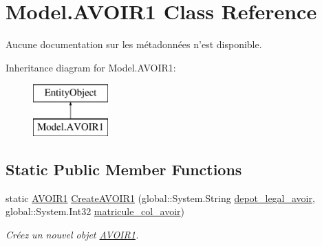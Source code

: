 \hypertarget{class_model_1_1_a_v_o_i_r1}{\section{Model.\-A\-V\-O\-I\-R1 Class Reference}
\label{class_model_1_1_a_v_o_i_r1}
}


Aucune documentation sur les métadonnées n'est disponible.  


Inheritance diagram for Model.\-A\-V\-O\-I\-R1\-:\begin{figure}[H]
\begin{center}
\leavevmode
\includegraphics[height=2.000000cm]{class_model_1_1_a_v_o_i_r1}
\end{center}
\end{figure}
\subsection*{Static Public Member Functions}
\begin{DoxyCompactItemize}
\item 
static \hyperlink{class_model_1_1_a_v_o_i_r1}{A\-V\-O\-I\-R1} \hyperlink{class_model_1_1_a_v_o_i_r1_a64ce6c9838eeeeadfb9829843eb2d72f}{Create\-A\-V\-O\-I\-R1} (global\-::\-System.\-String \hyperlink{class_model_1_1_a_v_o_i_r1_adf026bb26b0d9dbeeb67174ac7e4e6f4}{depot\-\_\-legal\-\_\-avoir}, global\-::\-System.\-Int32 \hyperlink{class_model_1_1_a_v_o_i_r1_a2a8193976f08870f00198f32d8ae2613}{matricule\-\_\-col\-\_\-avoir})
\begin{DoxyCompactList}\small\item\em Créez un nouvel objet \hyperlink{class_model_1_1_a_v_o_i_r1}{A\-V\-O\-I\-R1}. \end{DoxyCompactList}\end{DoxyCompactItemize}
